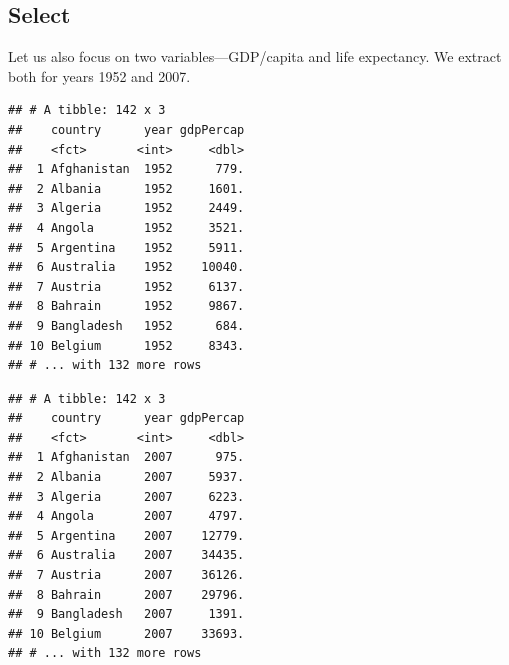 \documentclass[]{article}
\newenvironment{Shaded}{\begin{snugshade}}{\end{snugshade}}
\newcommand{\KeywordTok}[1]{\textcolor[rgb]{0.13,0.29,0.53}{\textbf{#1}}}
\newcommand{\DecValTok}[1]{\textcolor[rgb]{0.00,0.00,0.81}{#1}}
\newcommand{\StringTok}[1]{\textcolor[rgb]{0.31,0.60,0.02}{#1}}
\newcommand{\OperatorTok}[1]{\textcolor[rgb]{0.81,0.36,0.00}{\textbf{#1}}}
\newcommand{\NormalTok}[1]{#1}
\begin{document}
\subsection{Select}\label{select}

Let us also focus on two variables---GDP/capita and life expectancy. We
extract both for years 1952 and 2007.

\begin{Shaded}
\end{Shaded}

\begin{verbatim}
## # A tibble: 142 x 3
##    country      year gdpPercap
##    <fct>       <int>     <dbl>
##  1 Afghanistan  1952      779.
##  2 Albania      1952     1601.
##  3 Algeria      1952     2449.
##  4 Angola       1952     3521.
##  5 Argentina    1952     5911.
##  6 Australia    1952    10040.
##  7 Austria      1952     6137.
##  8 Bahrain      1952     9867.
##  9 Bangladesh   1952      684.
## 10 Belgium      1952     8343.
## # ... with 132 more rows
\end{verbatim}

\begin{Shaded}
\end{Shaded}

\begin{verbatim}
## # A tibble: 142 x 3
##    country      year gdpPercap
##    <fct>       <int>     <dbl>
##  1 Afghanistan  2007      975.
##  2 Albania      2007     5937.
##  3 Algeria      2007     6223.
##  4 Angola       2007     4797.
##  5 Argentina    2007    12779.
##  6 Australia    2007    34435.
##  7 Austria      2007    36126.
##  8 Bahrain      2007    29796.
##  9 Bangladesh   2007     1391.
## 10 Belgium      2007    33693.
## # ... with 132 more rows
\end{verbatim}

\begin{Shaded}
\end{Shaded}
\end{document}
